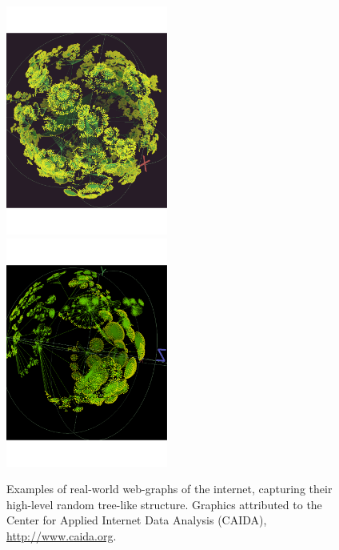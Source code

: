 \pubmode
	\begin{figure}[!htbp]
	\includegraphics[clip=true, width=0.475\textwidth]{webgraph_1}\\
	\includegraphics[clip=true, width=0.475\textwidth]{webgraph_2}
	\captionspacefig \caption{Examples of real-world web-graphs of the internet, capturing their high-level random tree-like structure. Graphics attributed to the Center for Applied Internet Data Analysis (CAIDA), \href{http://www.caida.org}{http://www.caida.org}.} \label{fig:webgraph}
	\end{figure}
\else
